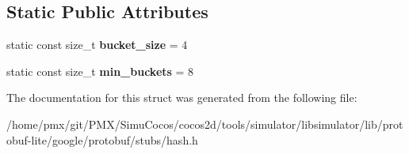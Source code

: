 \subsection*{Static Public Attributes}
\begin{DoxyCompactItemize}
\item 
\mbox{\label{structgoogle_1_1protobuf_1_1hash_3_01string_01_4_a4bea81bae7c84c85c5c8855a865a7502}} 
static const size\+\_\+t {\bfseries bucket\+\_\+size} = 4
\item 
\mbox{\label{structgoogle_1_1protobuf_1_1hash_3_01string_01_4_a2bd63d6dedb03a635e63f3211de4fd50}} 
static const size\+\_\+t {\bfseries min\+\_\+buckets} = 8
\end{DoxyCompactItemize}


The documentation for this struct was generated from the following file\+:\begin{DoxyCompactItemize}
\item 
/home/pmx/git/\+P\+M\+X/\+Simu\+Cocos/cocos2d/tools/simulator/libsimulator/lib/protobuf-\/lite/google/protobuf/stubs/hash.\+h\end{DoxyCompactItemize}
